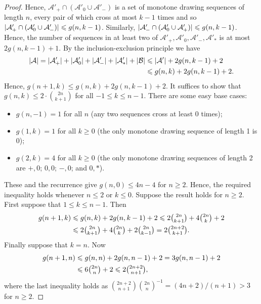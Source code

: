 \documentclass[10pt,a4paper]{amsart}
\DeclarePairedDelimiter{\abs}{\lvert}{\rvert} %
\newcommand{\BB}{\mathcal{B}}
\renewcommand{\AA}{\mathcal{A}}
\renewcommand{\geq}{\geqslant}
\renewcommand{\leq}{\leqslant}
\begin{document}
\begin{proof}
    Hence, $\AA'_{+} \cap (\AA'_{0} \cup \AA'_{-})$ is a set of monotone drawing sequences of length $n$, every pair of which cross at most $k - 1$ times and so $\abs{\AA'_{+} \cap (\AA'_{0} \cup \AA'_{-})} \leq g(n, k - 1)$. Similarly, $\abs{\AA'_{-} \cap (\AA'_{0} \cup \AA'_{+})} \leq g(n, k - 1)$. Hence, the number of sequences in at least two of $\AA'_{+}, \AA'_{0}, \AA'_{-}, \AA'_{\ast}$ is at most $2 g(n, k - 1) + 1$. By the inclusion-exclusion principle we have
    \begin{align*}
       \abs{\AA}  
       = \abs{\AA'_{+}} + \abs{\AA'_{0}} + \abs{\AA'_{-}} + \abs{\AA'_{\ast}} + \abs{\BB} 
        & \leq \abs{\AA'} + 2g(n, k - 1) + 2 \\
        & \leq g(n, k) + 2g(n, k - 1) + 2.
    \end{align*}
    Hence, $g(n + 1, k) \leq g(n, k) + 2g(n, k - 1) + 2$. It suffices to show that $g(n, k) \leq 2 \cdot \binom{2n}{k + 1}$ for all $-1 \leq k \leq n - 1$. There are some easy base cases:
    \begin{itemize}
        \item $g(n, -1) = 1$ for all $n$ (any two sequences cross at least 0 times);
        \item $g(1, k) = 1$ for all $k \geq 0$ (the only monotone drawing sequence of length 1 is $0$);
        \item $g(2, k) = 4$ for all $k \geq 0$ (the only monotone drawing sequences of length 2 are $+, 0$; $0,0$; $-, 0$; and $0,\ast$).
    \end{itemize}
    These and the recurrence give $g(n, 0) \leq 4n - 4$ for $n \geq 2$. Hence, the required inequality holds whenever $n \leq 2$ or $k \leq 0$. Suppose the result holds for $n \geq 2$. First suppose that $1 \leq k \leq n - 1$. Then
    \begin{align*}
        g(n + 1, k) & \leq g(n, k) + 2g(n, k - 1) + 2 \leq 2 \tbinom{2n}{k + 1} + 4 \tbinom{2n}{k} + 2 \\
        & \leq 2 \tbinom{2n}{k + 1} + 4 \tbinom{2n}{k} + 2 \tbinom{2n}{k - 1} = 2 \tbinom{2n + 2}{k + 1}.
    \end{align*}
    Finally suppose that $k = n$. Now
    \begin{align*}
        g(n + 1, n) & \leq g(n, n) + 2g(n, n - 1) + 2 = 3g(n, n - 1) + 2 \\
        & \leq 6 \tbinom{2n}{n} + 2 \leq 2 \tbinom{2n + 2}{n + 1},
    \end{align*}
    where the last inequality holds as $\binom{2n + 2}{n + 1} \binom{2n}{n}^{-1} = (4n + 2)/(n + 1) > 3$ for $n \geq 2$.
\end{proof}
\end{document}
